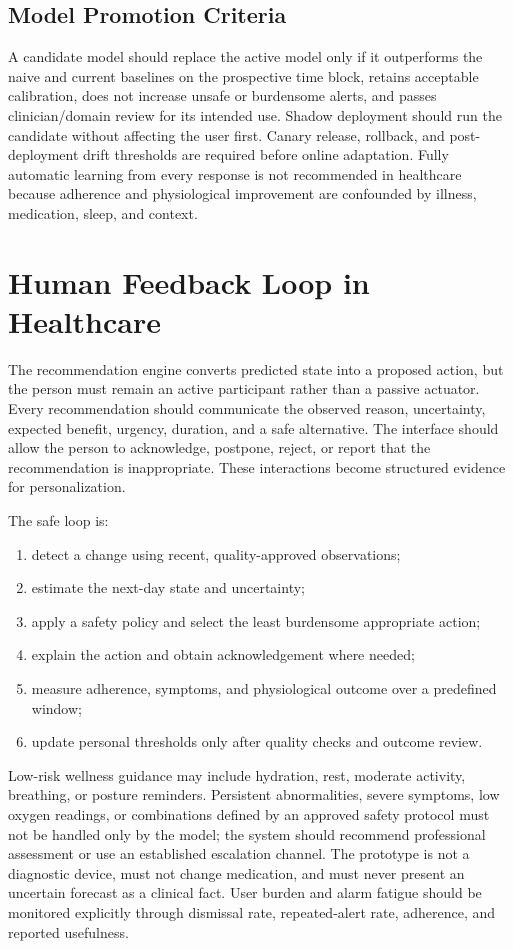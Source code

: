 \documentclass[11pt,a4paper]{article}
\begin{document}
\subsection{Model Promotion Criteria}
A candidate model should replace the active model only if it outperforms the naive and current baselines on the prospective time block, retains acceptable calibration, does not increase unsafe or burdensome alerts, and passes clinician/domain review for its intended use. Shadow deployment should run the candidate without affecting the user first. Canary release, rollback, and post-deployment drift thresholds are required before online adaptation. Fully automatic learning from every response is not recommended in healthcare because adherence and physiological improvement are confounded by illness, medication, sleep, and context.

\section{Human Feedback Loop in Healthcare}
The recommendation engine converts predicted state into a proposed action, but the person must remain an active participant rather than a passive actuator. Every recommendation should communicate the observed reason, uncertainty, expected benefit, urgency, duration, and a safe alternative. The interface should allow the person to acknowledge, postpone, reject, or report that the recommendation is inappropriate. These interactions become structured evidence for personalization.

The safe loop is:
\begin{enumerate}
    \item detect a change using recent, quality-approved observations;
    \item estimate the next-day state and uncertainty;
    \item apply a safety policy and select the least burdensome appropriate action;
    \item explain the action and obtain acknowledgement where needed;
    \item measure adherence, symptoms, and physiological outcome over a predefined window;
    \item update personal thresholds only after quality checks and outcome review.
\end{enumerate}

Low-risk wellness guidance may include hydration, rest, moderate activity, breathing, or posture reminders. Persistent abnormalities, severe symptoms, low oxygen readings, or combinations defined by an approved safety protocol must not be handled only by the model; the system should recommend professional assessment or use an established escalation channel. The prototype is not a diagnostic device, must not change medication, and must never present an uncertain forecast as a clinical fact. User burden and alarm fatigue should be monitored explicitly through dismissal rate, repeated-alert rate, adherence, and reported usefulness.
\end{document}
